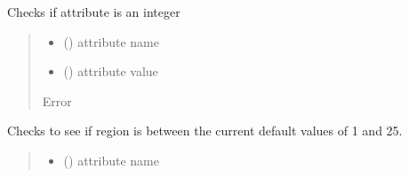 \documentclass[letterpaper,10pt,english]{sphinxmanual}
\begin{document}
\begin{fulllineitems}

\begin{fulllineitems}
\label{\detokenize{src.common.config_setup:src.common.config_setup.Config_settings._check_int}}
\pysigstartsignatures
\pysiglinewithargsret
{}
{\sphinxparamcomma {}}
{}
\pysigstopsignatures
\sphinxAtStartPar
Checks if attribute is an integer
\begin{quote}\begin{description}
\begin{itemize}
\item {} 
\sphinxAtStartPar
{} () \textendash{} attribute name

\item {} 
\sphinxAtStartPar
{} () \textendash{} attribute value

\end{itemize}

\sphinxAtStartPar
{} \textendash{} Error

\end{description}\end{quote}

\end{fulllineitems}


\begin{fulllineitems}
\label{\detokenize{src.common.config_setup:src.common.config_setup.Config_settings._check_regions}}
\pysigstartsignatures
\pysiglinewithargsret
{}
{\sphinxparamcomma {}}
{}
\pysigstopsignatures
\sphinxAtStartPar
Checks to see if region is between the current default values of 1 and 25.
\begin{quote}\begin{description}
\begin{itemize}
\item {} 
\sphinxAtStartPar
{} () \textendash{} attribute name


\end{itemize}
\end{description}
\end{quote}
\end{fulllineitems}
\end{fulllineitems}
\end{document}
